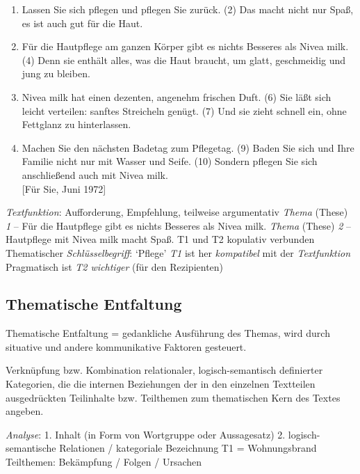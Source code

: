 \documentclass[
  letterpaper,
]{scrbook}
\providecommand{\tightlist}{%
  \setlength{\itemsep}{0pt}\setlength{\parskip}{0pt}}\usepackage{longtable,booktabs,array}
\begin{document}
\begin{enumerate}
\def\labelenumi{(\arabic{enumi})}
\tightlist
\item
  Lassen Sie sich pflegen und pflegen Sie zurück. (2) Das macht nicht
  nur Spaß, es ist auch gut für die Haut.\\
\item
  Für die Hautpflege am ganzen Körper gibt es nichts Besseres als Nivea
  milk. (4) Denn sie enthält alles, was die Haut braucht, um glatt,
  geschmeidig und jung zu bleiben.\\
\item
  Nivea milk hat einen dezenten, angenehm frischen Duft. (6) Sie läßt
  sich leicht verteilen: sanftes Streicheln genügt. (7) Und sie zieht
  schnell ein, ohne Fettglanz zu hinterlassen.\\
\item
  Machen Sie den nächsten Badetag zum Pflegetag. (9) Baden Sie sich und
  Ihre Familie nicht nur mit Wasser und Seife. (10) Sondern pflegen Sie
  sich anschließend auch mit Nivea milk.\\
  {[}Für Sie, Juni 1972{]}
\end{enumerate}

\emph{Textfunktion}: Aufforderung, Empfehlung, teilweise argumentativ
\emph{Thema} (These) \emph{1} -- Für die Hautpflege gibt es nichts
Besseres als Nivea milk. \emph{Thema} (These) \emph{2} -- Hautpflege mit
Nivea milk macht Spaß. T1 und T2 kopulativ verbunden Thematischer
\emph{Schlüsselbegriff}: `Pflege' \emph{T1} ist her \emph{kompatibel}
mit der \emph{Textfunktion} Pragmatisch ist \emph{T2 wichtiger} (für den
Rezipienten)

\hypertarget{thematische-entfaltung}{%
\subsection{Thematische Entfaltung}\label{thematische-entfaltung}}

Thematische Entfaltung = gedankliche Ausführung des Themas, wird durch
situative und andere kommunikative Faktoren gesteuert.

Verknüpfung bzw. Kombination relationaler, logisch-semantisch
definierter Kategorien, die die internen Beziehungen der in den
einzelnen Textteilen ausgedrückten Teilinhalte bzw. Teilthemen zum
thematischen Kern des Textes angeben.

\emph{Analyse}: 1. Inhalt (in Form von Wortgruppe oder Aussagesatz) 2.
logisch-semantische Relationen / kategoriale Bezeichnung T1 =
Wohnungsbrand Teilthemen: Bekämpfung / Folgen / Ursachen
\end{document}
